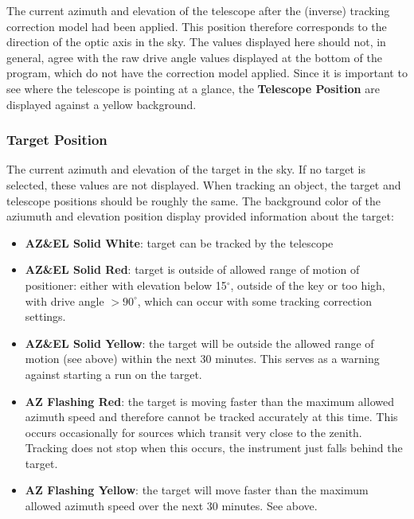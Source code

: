 \documentclass[letterpaper,12pt]{report}
\begin{document}
The current azimuth and elevation of the telescope after the (inverse)
tracking correction model had been applied. This position therefore
corresponds to the direction of the optic axis in the sky. The values
displayed here should not, in general, agree with the raw drive angle
values displayed at the bottom of the program, which do not have the
correction model applied. Since it is important to see where the
telescope is pointing at a glance, the \textbf{Telescope Position} are
displayed against a yellow background.

\subsubsection{Target Position}

The current azimuth and elevation of the target in the sky. If no
target is selected, these values are not displayed. When tracking an
object, the target and telescope positions should be roughly the same.
The background color of the aziumuth and elevation position display
provided information about the target:
\begin{itemize}
\item \textbf{AZ\&EL Solid White}: target can be tracked by the
telescope

\item \textbf{AZ\&EL Solid Red}: target is outside of allowed range
of motion of positioner: either with elevation below 15$^\circ$,
outside of the key or too high, with drive angle $>90^\circ$, which
can occur with some tracking correction settings.

\item \textbf{AZ\&EL Solid Yellow}: the target will be outside the
allowed range of motion (see above) within the next 30 minutes. This
serves as a warning against starting a run on the target.

\item \textbf{AZ Flashing Red}: the target is moving faster than the
maximum allowed azimuth speed and therefore cannot be tracked
accurately at this time. This occurs occasionally for sources which
transit very close to the zenith. Tracking does not stop when this
occurs, the instrument just falls behind the target.

\item \textbf{AZ Flashing Yellow}: the target will move faster than the
maximum allowed azimuth speed over the next 30 minutes. See above.
\end{itemize}
\end{document}
